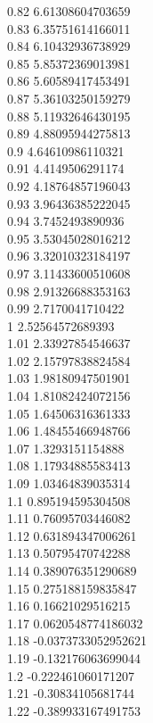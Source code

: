 {0.82	6.61308604703659\\
0.83	6.35751614166011\\
0.84	6.10432936738929\\
0.85	5.85372369013981\\
0.86	5.60589417453491\\
0.87	5.36103250159279\\
0.88	5.11932646430195\\
0.89	4.88095944275813\\
0.9	4.64610986110321\\
0.91	4.4149506291174\\
0.92	4.18764857196043\\
0.93	3.96436385222045\\
0.94	3.7452493890936\\
0.95	3.53045028016212\\
0.96	3.32010323184197\\
0.97	3.11433600510608\\
0.98	2.91326688353163\\
0.99	2.7170041710422\\
1	2.52564572689393\\
1.01	2.33927854546637\\
1.02	2.15797838824584\\
1.03	1.98180947501901\\
1.04	1.81082424072156\\
1.05	1.64506316361333\\
1.06	1.48455466948766\\
1.07	1.3293151154888\\
1.08	1.17934885583413\\
1.09	1.03464839035314\\
1.1	0.895194595304508\\
1.11	0.76095703446082\\
1.12	0.631894347006261\\
1.13	0.50795470742288\\
1.14	0.389076351290689\\
1.15	0.275188159835847\\
1.16	0.16621029516215\\
1.17	0.0620548774186032\\
1.18	-0.0373733052952621\\
1.19	-0.132176063699044\\
1.2	-0.222461060171207\\
1.21	-0.30834105681744\\
1.22	-0.389933167491753\\
}
